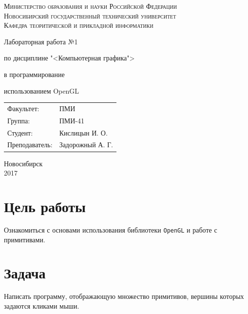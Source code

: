 \documentclass[oneside, final, 10pt]{extarticle}
\begin{document}
\begin{titlepage}
	\begin{centering}
		\textsc{Министерство образования и науки Российской Федерации}\\
		\textsc{Новосибирский государственный технический университет}\\
		\textsc{Кафедра теоритической и прикладной информатики}\\
	\end{centering}
	\vfill
	\vfill
	\vfill
	\Large
	\centerline{Лабораторная работа №1}
	\centerline{по дисциплине "<Компьютерная графика">}
	\centerline{ в программирование}
	\centerline{ использованием OpenGL}
	\normalsize
	\vfill
	\vfill
	\vfill
	\begin{flushleft}
		\begin{minipage}{0.3\textwidth}
			\begin{tabular}{l l}
				Факультет: & ПМИ\\
				Группа: & ПМИ-41\\
				Студент: & Кислицын И. О.\\
				Преподаватель: & Задорожный А. Г.\\
			\end{tabular}
		\end{minipage}
	\end{flushleft}
	\vfill
	\vfill
	\begin{centering}
		Новосибирск\\
		2017\\
	\end{centering}
\end{titlepage}
\setcounter{page}{2}
\lstset{
	breaklines=\true,
	basicstyle=\footnotesize\ttfamily,
	tabsize=2,
	showspaces=\false,
	showstringspaces=\false,
	breaklines=\true,
	breakatwhitespace=\true,
	extendedchars=\true,
	keepspaces=\true
}
\section{Цель работы}

Ознакомиться с основами использования библиотеки \verb~OpenGL~ и работе с примитивами.

\section{Задача}

Написать программу, отображающую множество примитивов, вершины которых задаются кликами мыши.
\end{document}
